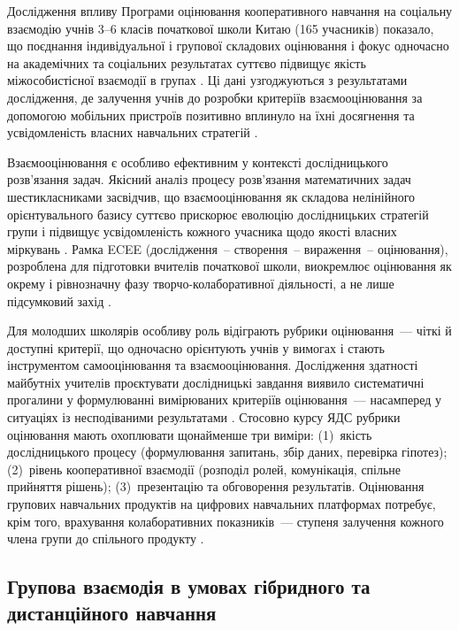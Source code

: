 \documentclass[a4paper,14pt]{extarticle}
\begin{document}
Дослідження впливу Програми оцінювання кооперативного навчання на соціальну взаємодію учнів 3--6 класів початкової школи Китаю (165 учасників) показало, що поєднання індивідуальної і групової складових оцінювання і фокус одночасно на академічних та соціальних результатах суттєво підвищує якість міжособистісної взаємодії в групах \parencite{Zeng2025317}. Ці дані узгоджуються з результатами дослідження, де залучення учнів до розробки критеріїв взаємооцінювання за допомогою мобільних пристроїв позитивно вплинуло на їхні досягнення та усвідомленість власних навчальних стратегій \parencite{Lai2015149}.

Взаємооцінювання є особливо ефективним у контексті дослідницького розв'язання задач. Якісний аналіз процесу розв'язання математичних задач шестикласниками засвідчив, що взаємооцінювання як складова нелінійного орієнтувального базису суттєво прискорює еволюцію дослідницьких стратегій групи і підвищує усвідомленість кожного учасника щодо якості власних міркувань \parencite{Torregrosa202189}. Рамка ECEE (дослідження~-- створення~-- вираження~-- оцінювання), розроблена для підготовки вчителів початкової школи, виокремлює оцінювання як окрему і рівнозначну фазу творчо-колаборативної діяльності, а не лише підсумковий захід \parencite{Mariati2026}.

Для молодших школярів особливу роль відіграють рубрики оцінювання~--- чіткі й доступні критерії, що одночасно орієнтують учнів у вимогах і стають інструментом самооцінювання та взаємооцінювання. Дослідження здатності майбутніх учителів проєктувати дослідницькі завдання виявило систематичні прогалини у формулюванні вимірюваних критеріїв оцінювання~--- насамперед у ситуаціях із несподіваними результатами \parencite{Lefkos2025349}. Стосовно курсу ЯДС рубрики оцінювання мають охоплювати щонайменше три виміри: (1)~якість дослідницького процесу (формулювання запитань, збір даних, перевірка гіпотез); (2)~рівень кооперативної взаємодії (розподіл ролей, комунікація, спільне прийняття рішень); (3)~презентацію та обговорення результатів. Оцінювання групових навчальних продуктів на цифрових навчальних платформах потребує, крім того, врахування колаборативних показників~--- ступеня залучення кожного члена групи до спільного продукту \parencite{Baziukė2025}.

\subsection{Групова взаємодія в умовах гібридного та дистанційного навчання}
\end{document}
